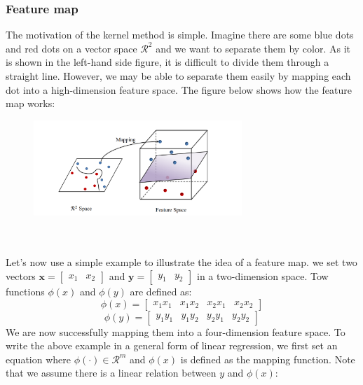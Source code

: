 \subsubsection{Feature map}
The motivation of the kernel method is simple. Imagine there are some blue dots and red dots on a vector space $\mathcal{R}^2$ and 
we want to separate them by color. As it is shown in the left-hand side figure, it is difficult to divide them through a straight 
line. However, we may be able to separate them easily by mapping each dot into a high-dimension feature space. The figure below 
shows how the feature map works:
\begin{figure}[htpb!]
    \centering
    \includegraphics[width=0.7\textwidth]{figure/Mapping.png}
\end{figure}
\\ \\
Let's now use a simple example to illustrate the idea of a feature map. 
we set two vectors $\textbf{x}=\begin{bmatrix}x_1&x_2\end{bmatrix}$ and $\textbf{y}=\begin{bmatrix}y_1&y_2\end{bmatrix}$ in a two-dimension space.
Tow functions $\phi(x)$ and $\phi(y)$ are defined as:
\begin{equation*}
    \phi(x)=\begin{bmatrix}
        x_1x_1&x_1x_2&x_2x_1&x_2x_2
    \end{bmatrix}
\end{equation*}
\begin{equation*}
    \phi(y)=\begin{bmatrix}
        y_1y_1&y_1y_2&y_2y_1&y_2y_2
    \end{bmatrix}
\end{equation*}
We are now successfully mapping them into a four-dimension feature space. 
To write the above example in a general form of linear regression, we first set an equation where $\phi(\cdot)\in\mathcal{R}^m$ and $\phi(x)$ is defined as the mapping function. Note that we assume there is a linear relation between $y$ and $\phi(x)$:
